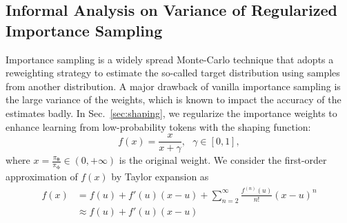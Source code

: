 





\subsection{Informal Analysis on Variance of Regularized Importance Sampling}\label{app:variance}

Importance sampling is a widely spread Monte-Carlo technique that adopts a reweighting strategy to estimate the so-called target distribution using samples from another distribution.
A major drawback of vanilla importance sampling is the large variance of the weights, which is known to impact the accuracy of the estimates badly.
In Sec.~\ref{sec:shaping}, we regularize the importance weights to enhance learning from low-probability tokens with the shaping function:
\begin{equation}
    f(x) = \frac{x}{x+\gamma},~~~\gamma\in [0,1],
\end{equation}
where $x=\frac{\pi_{\bm{\theta}}}{\pi_{\bm{\phi}}}\in(0,+\infty)$ is the original weight.
We consider the first-order approximation of $f(x)$ by Taylor expansion as 
\begin{equation}
\begin{aligned}
    f(x) & = f(u) + f'(u)(x-u) + \sum_{n=2}^\infty\frac{f^{(n)}(u)}{n!}(x-u)^n \\
    & \approx f(u) + f'(u)(x-u)
\end{aligned}
\end{equation}

